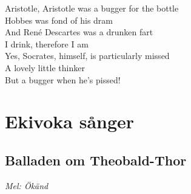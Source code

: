\documentclass[twoside, openright]{report}
\begin{document}
Aristotle, Aristotle was a bugger for the bottle\\
Hobbes was fond of his dram\\

And René Descartes was a drunken fart\\
I drink, therefore I am\\

Yes, Socrates, himself, is particularly missed\\
A lovely little thinker\\
But a bugger when he's pissed!\\

\chapter{Ekivoka sånger}

\section{Balladen om Theobald-Thor}
\textit{Mel: Ökänd}\\
\end{document}
